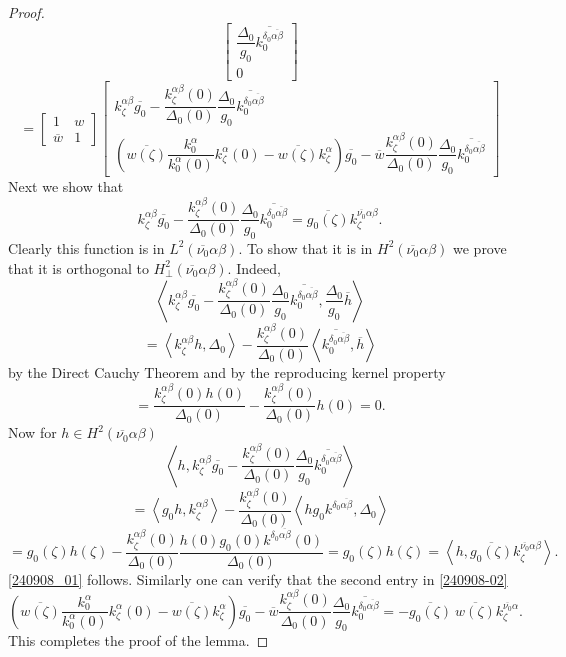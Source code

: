 \documentclass[reqno,11pt,centertags]{article}
\newcommand{\z}{\zeta}
\theoremstyle{definition}
\def\be{\begin{equation}}
\def\ee{\end{equation}}
\def\a{\alpha}
\def\b{\beta}
\def\d{\delta}
\def\D{\Delta}
\def\z{\zeta}
\begin{document}
\begin{proof}
$$\begin{bmatrix}
\dfrac{\D_0}{g_0}\overline{k^{\d_0\overline{\alpha\b}}_0}
\\
0
\end{bmatrix}
$$
\be\label{240908-02}
=
\left[\begin{array}{cc} 1& w \\
\overline{w} & 1\end{array}\right]\left[\begin{array}{c}
k^{\alpha\beta}_\zeta\overline{g_0}
-
\dfrac{k^{\alpha\beta}_\zeta (0)}{\D_0(0)}
\dfrac{\D_0}{g_0}\overline{k^{\d_0\overline{\alpha\b}}_0}
 \\
\left(
\overline{w(\zeta)} \dfrac{k^\a_0}{k^\a_0(0)}k^\alpha_\zeta(0)-\overline{w(\zeta)} k^\alpha_\zeta
\right)
\overline{g_0}
-\overline w
\dfrac{k^{\alpha\beta}_\zeta (0)}{\D_0(0)}
\dfrac{\D_0}{g_0}\overline{k^{\d_0\overline{\alpha\b}}_0}
\end{array}\right]
\ee
Next we show that
\be\label{240908_01}
k^{\alpha\beta}_\zeta\overline{g_0}
-
\dfrac{k^{\alpha\beta}_\zeta (0)}{\D_0(0)}
\dfrac{\D_0}{g_0}\overline{k^{\d_0\overline{\alpha\b}}_0}
=\overline{g_0(\z)}k^{\overline{\nu_0}\alpha\beta}_\zeta .
\ee
Clearly this function is in $L^2(\overline{\nu_0}\alpha\beta)$. To show that it is in
$H^2(\overline{\nu_0}\alpha\beta)$ we prove that it is orthogonal to
$H^2_\perp(\overline{\nu_0}\alpha\beta)$. Indeed,
$$
\left\langle
k^{\alpha\beta}_\zeta\overline{g_0}
-
\dfrac{k^{\alpha\beta}_\zeta (0)}{\D_0(0)}
\dfrac{\D_0}{g_0}\overline{k^{\d_0\overline{\alpha\b}}_0}
,
\dfrac{\D_0}{g_0}\overline h
\right\rangle
$$
$$
=
\left\langle
k^{\alpha\beta}_\zeta h
,
\D_0
\right\rangle
-
\dfrac{k^{\alpha\beta}_\zeta (0)}{\D_0(0)}
\left\langle
\overline{k^{\d_0\overline{\alpha\b}}_0}
,
\overline h
\right\rangle
$$
by the Direct Cauchy Theorem and by the reproducing kernel property
$$
=
\dfrac
{k^{\alpha\beta}_\zeta(0) h(0)}
{\D_0(0)}
-
\dfrac{k^{\alpha\beta}_\zeta (0)}{\D_0(0)}
h(0)
=0.
$$
Now for $h\in H^2(\overline{\nu_0}\alpha\beta)$
$$
\left\langle
h,
k^{\alpha\beta}_\zeta\overline{g_0}
-
\dfrac{k^{\alpha\beta}_\zeta (0)}{\D_0(0)}
\dfrac{\D_0}{g_0}\overline{k^{\d_0\overline{\alpha\b}}_0}
\right\rangle
$$
$$
=
\left\langle
g_0 h,
k^{\alpha\beta}_\zeta
\right\rangle
-
\dfrac{k^{\alpha\beta}_\zeta (0)}{\D_0(0)}
\left\langle
h g_0 k^{\d_0\overline{\alpha\b}},
\D_0
\right\rangle
$$
$$
=
g_0(\z) h(\z)
-
\dfrac{k^{\alpha\beta}_\zeta (0)}{\D_0(0)}
\dfrac
{h(0) g_0(0) k^{\d_0\overline{\alpha\b}}(0)}
{\D_0(0)}
=
g_0(\z) h(\z)
=\left\langle h, \overline{g_0(\z)}k^{\overline{\nu_0}\alpha\beta}_\zeta\right\rangle .
$$
\eqref{240908_01} follows. Similarly one can verify that the second entry in \eqref{240908-02}
$$
\left(
\overline{w(\zeta)} \dfrac{k^\a_0}{k^\a_0(0)}k^\alpha_\zeta(0)-\overline{w(\zeta)} k^\alpha_\zeta
\right)
\overline{g_0}
-\overline w
\dfrac{k^{\alpha\beta}_\zeta (0)}{\D_0(0)}
\dfrac{\D_0}{g_0}\overline{k^{\d_0\overline{\alpha\b}}_0}
=
-\overline{g_0(\z)}\ \overline{w(\z)}k^{\overline{\nu_0}\alpha}_\zeta.
$$
This completes the proof of the lemma.
\end{proof}
\end{document}
